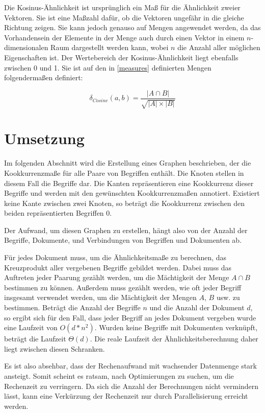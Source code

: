 Die Kosinus-Ähnlichkeit \cite{hkp2012} ist ursprünglich ein Maß für die Ähnlichkeit zweier Vektoren. Sie ist eine Maßzahl dafür, ob die Vektoren ungefähr in die gleiche Richtung zeigen. Sie kann jedoch genauso auf Mengen angewendet werden, da das Vorhandensein der Elemente in der Menge auch durch einen Vektor in einem \(n\)-dimensionalen Raum dargestellt werden kann, wobei \(n\) die Anzahl aller möglichen Eigenschaften ist. Der Wertebereich der Kosinus-Ähnlichkeit liegt ebenfalls zwischen \num{0} und \num{1}. Sie ist auf den in \ref{measures} definierten Mengen folgendermaßen definiert:

\[
\delta_{Cosine}(a, b) = \frac{|A \cap B|}{\sqrt{|A| \times |B|}}
\]

\section{Umsetzung}

Im folgenden Abschnitt wird die Erstellung eines Graphen beschrieben, der die Kookkurrenzmaße für alle Paare von Begriffen enthält. Die Knoten stellen in diesem Fall die Begriffe dar. Die Kanten repräsentieren eine Kookkurrenz dieser Begriffe und werden mit den gewünschten Kookkurrenzmaßen annotiert. Existiert keine Kante zwischen zwei Knoten, so beträgt die Kookkurrenz zwischen den beiden repräsentierten Begriffen \num{0}.

Der Aufwand, um diesen Graphen zu erstellen, hängt also von der Anzahl der Begriffe, Dokumente, und Verbindungen von Begriffen und Dokumenten ab.

Für jedes Dokument muss, um die Ähnlichkeitsmaße zu berechnen, das Kreuzprodukt aller vergebenen Begriffe gebildet werden. Dabei muss das Auftreten jeder Paarung gezählt werden, um die Mächtigkeit der Menge \(A \cap B\) bestimmen zu können. Außerdem muss gezählt werden, wie oft jeder Begriff insgesamt verwendet werden, um die Mächtigkeit der Mengen \(A\), \(B\) usw. zu bestimmen. Beträgt die Anzahl der Begriffe \(n\) und die Anzahl der Dokument \(d\), so ergibt sich für den Fall, dass jeder Begriff an jedes Dokument vergeben wurde eine Laufzeit von \(O(d*n^2)\). Wurden keine Begriffe mit Dokumenten verknüpft, beträgt die Laufzeit \(\Theta(d)\). Die reale Laufzeit der Ähnlichkeitsberechnung daher liegt zwischen diesen Schranken.

Es ist also absehbar, dass der Rechenaufwand mit wachsender Datenmenge stark ansteigt. Somit scheint es ratsam, nach Optimierungen zu suchen, um die Rechenzeit zu verringern. Da sich die Anzahl der Berechnungen nicht vermindern lässt, kann eine Verkürzung der Rechenzeit nur durch Parallelisierung erreicht werden.

